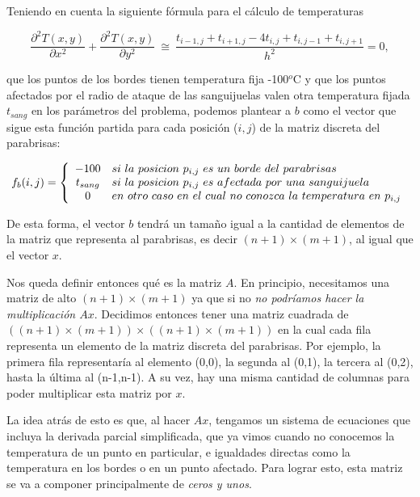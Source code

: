 \vspace{\baselineskip}

 Teniendo en cuenta la siguiente fórmula para el cálculo de temperaturas

\[
\frac{\partial^2T(x,y)}{\partial x^{2}}+\frac{\partial^2 T(x,y)}{\partial y^{2}} \ \cong \ \frac{ t_{i-1,j} + t_{i+1,j} - 4t_{i,j} + t_{i,j-1} + t_{i,j+1}}{h^2} = 0,
\]

que los puntos de los bordes tienen temperatura fija -100${}^o$C y que los puntos afectados por el radio de ataque de las sanguijuelas valen otra temperatura fijada $t_{sang}$ en los parámetros del problema, podemos plantear a $b$ como el vector que sigue esta función partida para cada posición ($i,j$) de la matriz discreta del parabrisas:

$$f_{b}(i,j) = \left\{
\begin{array}{c l}
 -100 & si \ la \ posicion  \ p_{i,j} \ es  \ un \ borde  \ del \ parabrisas\\
 t_{sang} & si \ la \ posicion  \ p_{i,j} \ es \ afectada \ por \ una \ sanguijuela \\
 0 & en \ otro \ caso \ en \ el \ cual \ no \ conozca \ la \ temperatura \ en \ p_{i,j}
\end{array}
\right.
$$

De esta forma, el vector $b$ tendrá un tamaño igual a la cantidad de elementos de la matriz que representa al parabrisas, es decir $(n+1) \times (m+1)$, al igual que el vector $x$.

\vspace{\baselineskip}

Nos queda definir entonces qué es la matriz $A$. En principio, necesitamos una matriz de alto $(n+1) \times (m+1)$ ya que si no \textit{no podríamos hacer la multiplicación $Ax$}. Decidimos entonces tener una matriz cuadrada de  $((n+1) \times (m+1)) \times  ((n+1) \times (m+1))$ en la cual cada fila representa un elemento de la matriz discreta del parabrisas. Por ejemplo, la primera fila representaría al elemento (0,0), la segunda al (0,1), la tercera al (0,2), hasta la última al (n-1,n-1). A su vez, hay una misma cantidad de columnas para poder multiplicar esta matriz por $x$.

La idea atrás de esto es que, al hacer $Ax$, tengamos un sistema de ecuaciones que incluya la derivada parcial simplificada, que ya vimos cuando no conocemos la temperatura de un punto en particular, e igualdades directas como la temperatura en los bordes o en un punto afectado. Para lograr esto, esta matriz se va a componer principalmente de \textit{ceros y unos}.

